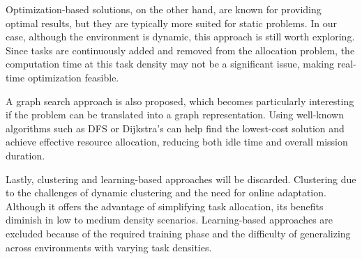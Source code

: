 Optimization-based solutions, on the other hand, are known for providing optimal results, but they are typically more suited for static problems. In our case, although the environment is dynamic, this approach is still worth exploring. Since tasks are continuously added and removed from the allocation problem, the computation time at this task density may not be a significant issue, making real-time optimization feasible.

A graph search approach is also proposed, which becomes particularly interesting if the problem can be translated into a graph representation. Using well-known algorithms such as \ac{DFS} or Dijkstra's can help find the lowest-cost solution and achieve effective resource allocation, reducing both idle time and overall mission duration.

Lastly, clustering and learning-based approaches will be discarded. Clustering due to the challenges of dynamic clustering and the need for online adaptation. Although it offers the advantage of simplifying task allocation, its benefits diminish in low to medium density scenarios. Learning-based approaches are excluded because of the required training phase and the difficulty of generalizing across environments with varying task densities.